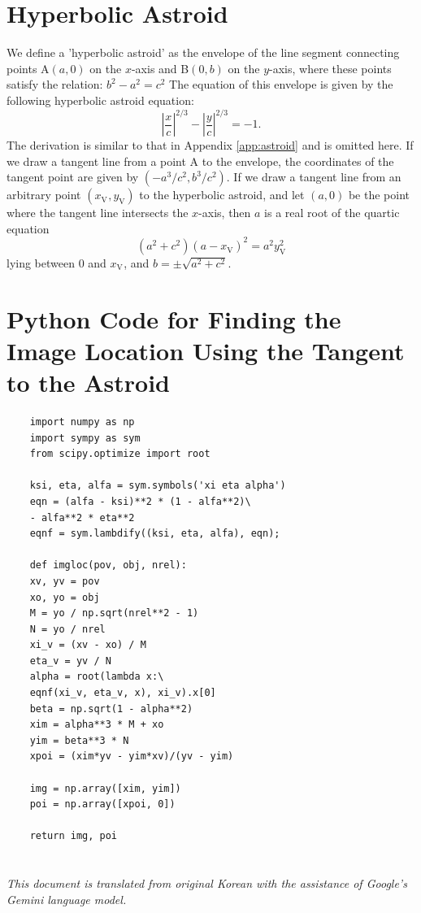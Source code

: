 \documentclass[twocolumn]{article}
\begin{document}
\section{Hyperbolic Astroid} \label{app:hyperastroid}
We define a 'hyperbolic astroid' as the envelope of the line segment connecting points A$(a, 0)$ on the $x$-axis and B$(0, b)$ on the $y$-axis, where these points satisfy the relation:
$b^2-a^2=c^2$
The equation of this envelope is given by the following hyperbolic astroid equation:
$$ \left|\dfrac{x}{c}\right|^{2/3} - \left|\dfrac{y}{c}\right|^{2/3} = -1. $$
The derivation is similar to that in Appendix \ref{app:astroid} and is omitted here.
If we draw a tangent line from a point A to the envelope, the coordinates of the tangent point are given by $(-a^3/c^2, b^3/c^2)$. 
If we draw a tangent line from an arbitrary point $(x_{\mathrm{V}^{}}, y_{\mathrm{V}}^{})$ to the hyperbolic astroid, and let $(a,0)$ be the point where the tangent line intersects the $x$-axis, then $a$ is a real root of the quartic equation
$$ \left( a^2 + c^2 \right) \left(a - x_{\mathrm{V}}^{} \right)^2 = a^2 y_{\mathrm{V}}^2$$
lying between $0$ and $x_{\mathrm{V}^{}}$, and $b = \pm \sqrt{a^2 + c^2}$.

\section{Python Code for Finding the Image Location Using the Tangent to the Astroid} \label{app:python}
\begin{verbatim}
	import numpy as np
	import sympy as sym
	from scipy.optimize import root
	
	ksi, eta, alfa = sym.symbols('xi eta alpha')
	eqn = (alfa - ksi)**2 * (1 - alfa**2)\
	- alfa**2 * eta**2
	eqnf = sym.lambdify((ksi, eta, alfa), eqn);
	
	def imgloc(pov, obj, nrel):
	xv, yv = pov
	xo, yo = obj
	M = yo / np.sqrt(nrel**2 - 1)
	N = yo / nrel
	xi_v = (xv - xo) / M
	eta_v = yv / N
	alpha = root(lambda x:\
	eqnf(xi_v, eta_v, x), xi_v).x[0]
	beta = np.sqrt(1 - alpha**2)
	xim = alpha**3 * M + xo
	yim = beta**3 * N
	xpoi = (xim*yv - yim*xv)/(yv - yim)
	
	img = np.array([xim, yim])
	poi = np.array([xpoi, 0])
	
	return img, poi
\end{verbatim}

\vfill
\section*{}
\slshape{This document is translated from original Korean with the assistance of Google's Gemini language model.}
\end{document}
